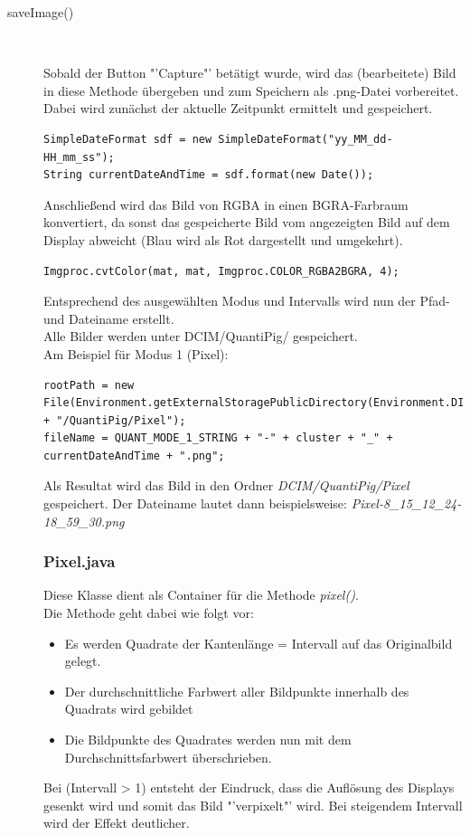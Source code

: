 \begin{description}
\item[saveImage()]~\par
\label{saveImage}
Sobald der Button "'Capture"' betätigt wurde, wird das (bearbeitete) Bild in diese Methode übergeben und zum Speichern als .png-Datei vorbereitet.\\
Dabei wird zunächst der aktuelle Zeitpunkt ermittelt und gespeichert. 
\begin{lstlisting}
SimpleDateFormat sdf = new SimpleDateFormat("yy_MM_dd-HH_mm_ss");
String currentDateAndTime = sdf.format(new Date());
\end{lstlisting}


Anschließend wird das Bild von RGBA in einen BGRA-Farbraum konvertiert, da sonst das gespeicherte Bild vom angezeigten Bild auf dem Display abweicht (Blau wird als Rot dargestellt und umgekehrt). 
\begin{lstlisting}
Imgproc.cvtColor(mat, mat, Imgproc.COLOR_RGBA2BGRA, 4);
\end{lstlisting}
Entsprechend des ausgewählten Modus und Intervalls wird nun der Pfad- und Dateiname erstellt.\\
Alle Bilder werden unter DCIM/QuantiPig/ gespeichert.\\
Am Beispiel für Modus 1 (Pixel):
\begin{lstlisting}
rootPath = new File(Environment.getExternalStoragePublicDirectory(Environment.DIRECTORY_DCIM).getPath() + "/QuantiPig/Pixel");
fileName = QUANT_MODE_1_STRING + "-" + cluster + "_" + currentDateAndTime + ".png";
\end{lstlisting}
Als Resultat wird das Bild in den Ordner \textit{DCIM/QuantiPig/Pixel} gespeichert.
Der Dateiname lautet dann beispielsweise: \textit{Pixel-8\_15\_12\_24-18\_59\_30.png}

\newpage

\subsubsection{Pixel.java}
\label{Pixel}
Diese Klasse dient als Container für die Methode \textit{pixel()}.\\
Die Methode geht dabei wie folgt vor:
\begin{itemize}
\item Es werden Quadrate der Kantenlänge = Intervall auf das Originalbild gelegt.
\item Der durchschnittliche Farbwert aller Bildpunkte innerhalb des Quadrats wird gebildet
\item Die Bildpunkte des Quadrates werden nun mit dem Durchschnittsfarbwert überschrieben.
\end{itemize}
Bei (Intervall > 1) entsteht der Eindruck, dass die Auflösung des Displays gesenkt wird und somit das Bild "'verpixelt"' wird. Bei steigendem Intervall wird der Effekt deutlicher. \\


\end{description}

